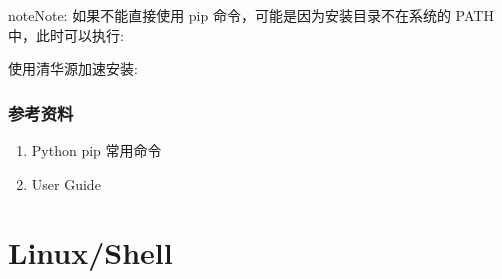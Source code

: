 \documentclass[letterpaper,10pt,english]{sphinxmanual}
\begin{document}
\begin{sphinxadmonition}{note}{Note:}
如果不能直接使用 pip 命令，可能是因为安装目录不在系统的 PATH 中，此时可以执行:

%
\begin{sphinxVerbatim}[commandchars=\\\{\}]
    
     
\end{sphinxVerbatim}

使用清华源加速安装:

%
\begin{sphinxVerbatim}[commandchars=\\\{\}]
    
\end{sphinxVerbatim}
\end{sphinxadmonition}


\subsection{参考资料}
\label{\detokenize{python/17_pip:id2}}\begin{enumerate}
\item {} 
Python pip 常用命令

\end{enumerate}
\begin{quote}

\end{quote}
\begin{enumerate}
\setcounter{enumi}{1}
\item {} 
User Guide

\end{enumerate}
\begin{quote}

\end{quote}


\chapter{Linux/Shell}
\label{\detokenize{linux/index:linux-shell}}\label{\detokenize{linux/index::doc}}
\end{document}
